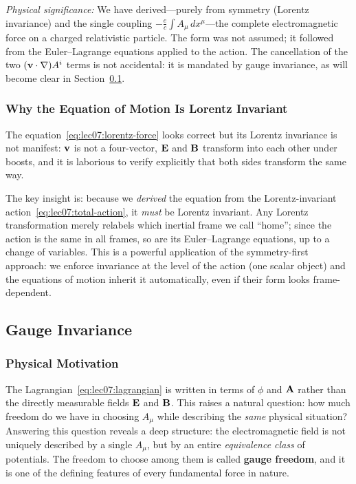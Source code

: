 \textit{Physical significance:}  We have derived—purely from symmetry (Lorentz
invariance) and the single coupling $-\tfrac{e}{c}\int A_\mu\,dx^\mu$—the
complete electromagnetic force on a charged relativistic particle.  The form was
not assumed; it followed from the Euler--Lagrange equations applied to the
action.  The cancellation of the two $(\mathbf{v}\cdot\nabla)A^i$ terms is not
accidental: it is mandated by gauge invariance, as will become clear in
Section~\ref{sec:lec07:gauge}.

\subsubsection*{Why the Equation of Motion Is Lorentz Invariant}

The equation~\eqref{eq:lec07:lorentz-force} looks correct but its Lorentz
invariance is not manifest: $\mathbf{v}$ is not a four-vector, $\mathbf{E}$ and $\mathbf{B}$
transform into each other under boosts, and it is laborious to verify explicitly
that both sides transform the same way.

The key insight is: because we \emph{derived} the equation from the
Lorentz-invariant action~\eqref{eq:lec07:total-action}, it \emph{must} be
Lorentz invariant.  Any Lorentz transformation merely relabels which inertial
frame we call ``home''; since the action is the same in all frames, so are its
Euler--Lagrange equations, up to a change of variables.  This is a powerful
application of the symmetry-first approach: we enforce invariance at the level
of the action (one scalar object) and the equations of motion inherit it
automatically, even if their form looks frame-dependent.

\subsection{Gauge Invariance}\label{sec:lec07:gauge}

\subsubsection*{Physical Motivation}

The Lagrangian~\eqref{eq:lec07:lagrangian} is written in terms of $\phi$ and
$\mathbf{A}$ rather than the directly measurable fields $\mathbf{E}$ and $\mathbf{B}$.  This
raises a natural question: how much freedom do we have in choosing $A_\mu$
while describing the \emph{same} physical situation?  Answering this question
reveals a deep structure: the electromagnetic field is not uniquely described
by a single $A_\mu$, but by an entire \emph{equivalence class} of potentials.
The freedom to choose among them is called \textbf{gauge freedom}, and it is
one of the defining features of every fundamental force in nature.

